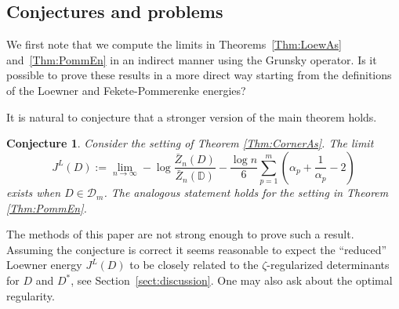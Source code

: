 \documentclass{article}
\numberwithin{equation}{section}
\numberwithin{figure}{section}
\theoremstyle{plain}
\theoremstyle{plain}
\numberwithin{thm}{section}
\newtheorem{conjecture}[thm]{Conjecture}
\theoremstyle{remark}
\newcommand{\D}{\mathbb{D}}
\begin{document}
\subsection{Conjectures and problems}\label{sect:conjectures}
We first note that we compute the limits in Theorems~\ref{Thm:LoewAs} and~\ref{Thm:PommEn} in an indirect manner using the
Grunsky operator. Is it possible to prove these results in a more direct way starting from the definitions of the Loewner and Fekete-Pommerenke energies?

It is natural to conjecture that a stronger version of the main theorem holds.
\begin{conjecture}Consider the setting of Theorem \ref{Thm:CornerAs}. The limit
\begin{equation*}
  J^L(D):= \lim_{n\to\infty}-\log \frac{\bar Z_n(D)}{\bar Z_n(\D)}-\frac {\log n}6\sum_{p=1}^m \left(\alpha_p+\frac 1{\alpha_p}-2 \right)
\end{equation*}
exists when $D \in \mathcal{D}_m$. The analogous statement holds for the setting in Theorem \ref{Thm:PommEn}. 
\end{conjecture}
The methods of this paper are not strong enough to prove such a result. Assuming the conjecture is correct it seems reasonable to expect the ``reduced'' Loewner energy $J^L(D)$ to be closely related to the $\zeta$-regularized determinants for $D$ and  $D^*$, see Section~\ref{sect:discussion}. One may also ask about the optimal regularity.
\end{document}
